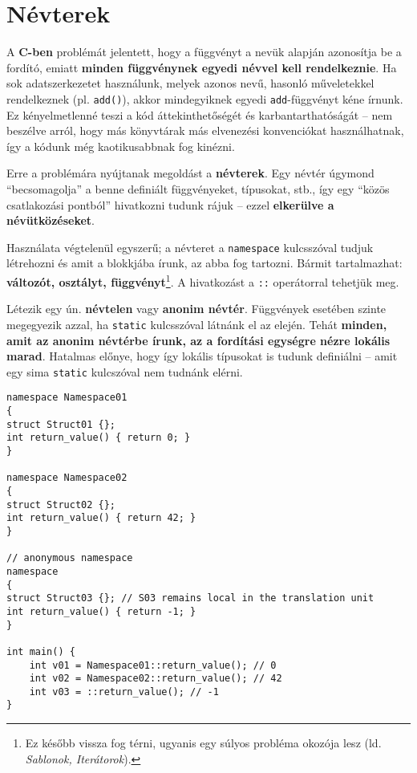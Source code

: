 \documentclass[a4paper, 11pt, oneside]{book}
\begin{document}
\section{Névterek}

A \textbf{C-ben} problémát jelentett, hogy a függvényt a nevük alapján azonosítja be a fordító, emiatt \textbf{minden függvénynek egyedi névvel kell rendelkeznie}. Ha sok adatszerkezetet használunk, melyek azonos nevű, hasonló műveletekkel rendelkeznek (pl. \verb*|add()|), akkor mindegyiknek egyedi \verb|add|-függvényt kéne írnunk. Ez kényelmetlenné teszi a kód áttekinthetőségét és karbantarthatóságát -- nem beszélve arról, hogy más könyvtárak más elvenezési konvenciókat használhatnak, így a kódunk még kaotikusabbnak fog kinézni.

Erre a problémára nyújtanak megoldást a \textbf{névterek}. Egy névtér úgymond ``becsomagolja'' a benne definiált függvényeket, típusokat, stb., így egy ``közös csatlakozási pontból'' hivatkozni tudunk rájuk -- ezzel \textbf{elkerülve a névütközéseket}.

Használata végtelenül egyszerű; a névteret a \verb*|namespace| kulcsszóval tudjuk létrehozni és amit a blokkjába írunk, az abba fog tartozni. Bármit tartalmazhat: \textbf{változót, osztályt, függvényt}\footnote{Ez később vissza fog térni, ugyanis egy súlyos probléma okozója lesz (ld. \textit{Sablonok, Iterátorok}).}. A hivatkozást a \verb*|::| operátorral tehetjük meg.

Létezik egy ún. \textbf{névtelen} vagy \textbf{anonim névtér}. Függvények esetében szinte megegyezik azzal, ha \verb*|static| kulcsszóval látnánk el az elején. Tehát \textbf{minden, amit az anonim névtérbe írunk, az a fordítási egységre nézre lokális marad}. Hatalmas előnye, hogy így lokális típusokat is tudunk definiálni -- amit egy sima \verb*|static| kulcszóval nem tudnánk elérni.

\begin{lstlisting}[style=cppstyle]
namespace Namespace01 
{
struct Struct01 {};
int return_value() { return 0; }
}

namespace Namespace02 
{
struct Struct02 {};
int return_value() { return 42; }
}

// anonymous namespace
namespace
{
struct Struct03 {};	// S03 remains local in the translation unit
int return_value() { return -1; }
}

int main() {
	int v01 = Namespace01::return_value(); // 0
	int v02 = Namespace02::return_value(); // 42
	int v03 = ::return_value(); // -1
}
\end{lstlisting}
\end{document}
